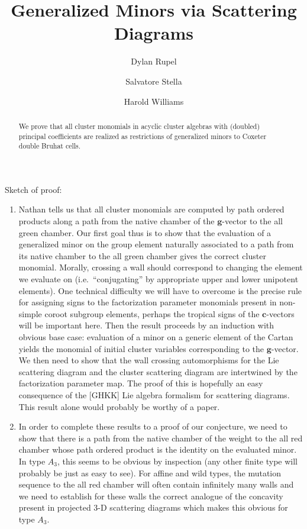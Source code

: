 \documentclass{amsart}
\title{Generalized Minors via Scattering Diagrams}
\author{Dylan Rupel}
\author{Salvatore Stella}
\author{Harold Williams}
\numberwithin{theorem}{section}
\newcommand{\bfc}{\mathbf{c}}
\newcommand{\bfg}{\mathbf{g}}
\begin{document}
  \maketitle
  \begin{abstract}
    We prove that all cluster monomials in acyclic cluster algebras with (doubled) principal coefficients are realized as restrictions of generalized minors to Coxeter double Bruhat cells.
  \end{abstract}

  Sketch of proof:
  \begin{enumerate}
    \item Nathan tells us that all cluster monomials are computed by path ordered products along a path from the native chamber of the $\bfg$-vector to the all green chamber.
      Our first goal thus is to show that the evaluation of a generalized minor on the group element naturally associated to a path from its native chamber to the all green chamber gives the correct cluster monomial.
      Morally, crossing a wall should correspond to changing the element we evaluate on (i.e.\ ``conjugating'' by appropriate upper and lower unipotent elements).
      One technical difficulty we will have to overcome is the precise rule for assigning signs to the factorization parameter monomials present in non-simple coroot subgroup elements, perhaps the tropical signs of the $\bfc$-vectors will be important here.
      Then the result proceeds by an induction with obvious base case: evaluation of a minor on a generic element of the Cartan yields the monomial of initial cluster variables corresponding to the $\bfg$-vector.
      We then need to show that the wall crossing automorphisms for the Lie scattering diagram and the cluster scattering diagram are intertwined by the factorization parameter map.
      The proof of this is hopefully an easy consequence of the [GHKK] Lie algebra formalism for scattering diagrams.
      This result alone would probably be worthy of a paper.
    \item In order to complete these results to a proof of our conjecture, we need to show that there is a path from the native chamber of the weight to the all red chamber whose path ordered product is the identity on the evaluated minor.
      In type $A_3$, this seems to be obvious by inspection (any other finite type will probably be just as easy to see).
      For affine and wild types, the mutation sequence to the all red chamber will often contain infinitely many walls and we need to establish for these walls the correct analogue of the concavity present in projected 3-D scattering diagrams which makes this obvious for type $A_3$.
  \end{enumerate}
\end{document}
